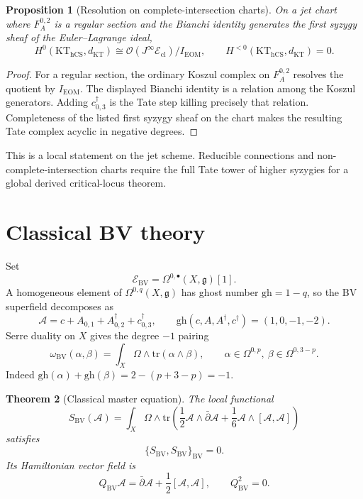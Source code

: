 \documentclass[11pt]{amsart}
\providecommand{\cE}{\mathcal{E}}
\providecommand{\cO}{\mathcal{O}}
\providecommand{\BV}{\mathrm{BV}}
\providecommand{\KT}{\mathrm{KT}}
\providecommand{\EOM}{\mathrm{EOM}}
\providecommand{\dbar}{\bar{\partial}}
\providecommand{\g}{\mathfrak{g}}
\providecommand{\gh}{\mathrm{gh}}
\providecommand{\hCS}{\mathrm{hCS}}
\providecommand{\tr}{\mathrm{tr}}
\providecommand{\Jinf}{J^{\infty}}
\theoremstyle{plain}
\newtheorem{theorem}{Theorem}[section]
\newtheorem{proposition}[theorem]{Proposition}
\theoremstyle{definition}
\begin{document}
\begin{proposition}[Resolution on complete-intersection charts]
\label{prop:KT-resolution}
On a jet chart where \(F_A^{0,2}\) is a regular section and the Bianchi
identity generates the first syzygy sheaf of the Euler--Lagrange ideal,
\[
  H^0(\KT_{\hCS},d_{\KT})
  \cong
  \cO(\Jinf\cE_{\mathrm{cl}})/I_{\EOM},
  \qquad
  H^{<0}(\KT_{\hCS},d_{\KT})=0 .
\]
\end{proposition}

\begin{proof}
For a regular section, the ordinary Koszul complex on
\(F_A^{0,2}\) resolves the quotient by \(I_{\EOM}\). The displayed
Bianchi identity is a relation among the Koszul generators. Adding
\(c^\dagger_{0,3}\) is the Tate step killing precisely that relation.
Completeness of the listed first syzygy sheaf on the chart makes the
resulting Tate complex acyclic in negative degrees.
\end{proof}

This is a local statement on the jet scheme. Reducible connections and
non-complete-intersection charts require the full Tate tower of higher
syzygies for a global derived critical-locus theorem.

\section{Classical BV theory}

Set
\[
  \cE_{\BV}=\Omega^{0,\bullet}(X,\g)[1].
\]
A homogeneous element of \(\Omega^{0,q}(X,\g)\) has ghost number
\(\gh=1-q\), so the BV superfield decomposes as
\[
  \mathcal A
  =
  c+A_{0,1}+A^\dagger_{0,2}+c^\dagger_{0,3},
  \qquad
  \gh(c,A,A^\dagger,c^\dagger)=(1,0,-1,-2).
\]
Serre duality on \(X\) gives the degree \(-1\) pairing
\[
  \omega_{\BV}(\alpha,\beta)
  =
  \int_X\Omega\wedge\tr(\alpha\wedge\beta),
  \qquad
  \alpha\in\Omega^{0,p},\ \beta\in\Omega^{0,3-p}.
\]
Indeed \(\gh(\alpha)+\gh(\beta)=2-(p+3-p)=-1\).

\begin{theorem}[Classical master equation]
\label{thm:CME}
The local functional
\[
  S_{\BV}(\mathcal A)=
  \int_X\Omega\wedge
  \tr\!\left(
    \frac12\mathcal A\wedge\dbar\mathcal A
    +\frac16\mathcal A\wedge[\mathcal A,\mathcal A]\right)
\]
satisfies
\[
  \{S_{\BV},S_{\BV}\}_{\BV}=0 .
\]
Its Hamiltonian vector field is
\[
  Q_{\BV}\mathcal A=\dbar\mathcal A+\frac12[\mathcal A,\mathcal A],
  \qquad
  Q_{\BV}^2=0 .
\]
\end{theorem}
\end{document}
